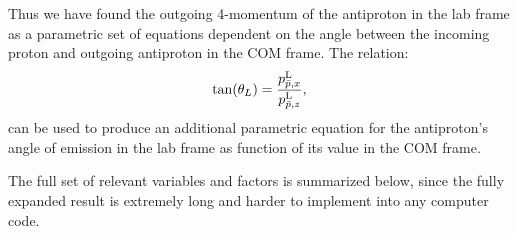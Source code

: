 Thus we have found the outgoing 4-momentum of the antiproton in the lab frame as a parametric set of equations dependent on the angle between the incoming proton and outgoing antiproton in the \ac{COM} frame.
The relation:
\begin{align}
\tan(\theta_L)=\frac{p^{\textrm{L}}_{\bar{p},x}}{p^{\textrm{L}}_{\bar{p},z}},
\end{align}
can be used to produce an additional parametric equation for the antiproton's angle of emission in the lab frame as function of its value in the COM frame.

The full set of relevant variables and factors is summarized below, since the fully expanded result is extremely long and harder to implement into any computer code.

%
